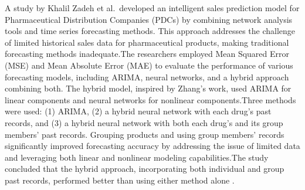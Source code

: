 \documentclass[
  authoryear,
  preprint,
  3p]{elsarticle}
\begin{document}
A study by Khalil Zadeh et al.~developed an intelligent sales prediction
model for Pharmaceutical Distribution Companies (PDCs) by combining
network analysis tools and time series forecasting methods. This
approach addresses the challenge of limited historical sales data for
pharmaceutical products, making traditional forecasting methods
inadequate\citep{zhang2004neural}.The researchers employed Mean Squared
Error (MSE) and Mean Absolute Error (MAE) to evaluate the performance of
various forecasting models, including ARIMA, neural networks, and a
hybrid approach combining both. The hybrid model, inspired by Zhang's
work\citep{zhang2004neural}, used ARIMA for linear components and neural
networks for nonlinear components.Three methods were used: (1) ARIMA,
(2) a hybrid neural network with each drug's past records, and (3) a
hybrid neural network with both each drug's and its group members' past
records. Grouping products and using group members' records
significantly improved forecasting accuracy by addressing the issue of
limited data and leveraging both linear and nonlinear modeling
capabilities.The study concluded that the hybrid approach, incorporating
both individual and group past records, performed better than using
either method alone \citep{khalil2014intelligent}.
\end{document}
